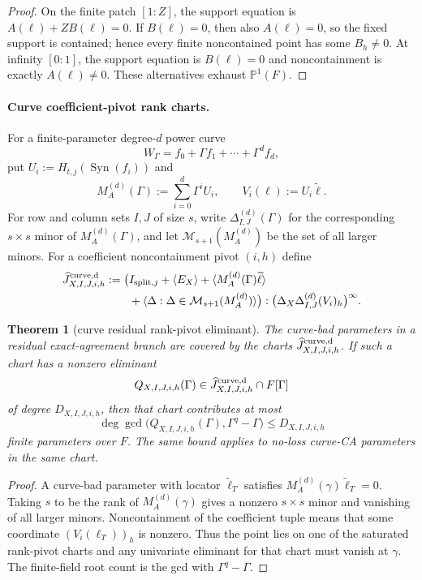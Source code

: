 \documentclass[11pt]{article}
\newtheorem{theorem}{Theorem}[section]
\theoremstyle{definition}
\theoremstyle{remark}
\newcommand{\Syn}{\operatorname{Syn}}
\begin{document}
\begin{proof}
On the finite patch $[1:Z]$, the support equation is
$A(\ell)+ZB(\ell)=0$.  If $B(\ell)=0$, then also $A(\ell)=0$, so the fixed
support is contained; hence every finite noncontained point has some
$B_h\ne0$.  At infinity $[0:1]$, the support equation is $B(\ell)=0$ and
noncontainment is exactly $A(\ell)\ne0$.  These alternatives exhaust
$\mathbb P^1(F)$.
\end{proof}

\paragraph{Curve coefficient-pivot rank charts.}
For a finite-parameter degree-$d$ power curve
\[
        W_\Gamma=f_0+\Gamma f_1+\cdots+\Gamma^d f_d,
\]
put $U_i:=H_{t,j}(\Syn(f_i))$ and
\[
        M_A^{(d)}(\Gamma):=
        \sum_{i=0}^{d}\Gamma^i U_i,
        \qquad
        V_i(\ell):=U_i\widetilde\ell .
\]
For row and column sets $I,J$ of size $s$, write
$\Delta_{I,J}^{(d)}(\Gamma)$ for the corresponding $s\times s$ minor of
$M_A^{(d)}(\Gamma)$, and let $\mathcal M_{s+1}(M_A^{(d)})$ be the set of all
larger minors.  For a coefficient noncontainment pivot $(i,h)$ define
\[
\begin{aligned}
        \widehat J^{\rm curve,d}_{X,I,J,i,h}:=
        \bigl(&I_{{\rm split},j}+\langle E_X\rangle
        +\langle M_A^{(d)}(\Gamma)\widetilde\ell\rangle\\
        &+\langle \Delta: \Delta\in\mathcal M_{s+1}(M_A^{(d)})\rangle
        \bigr):
        \bigl(\Delta_X\Delta_{I,J}^{(d)}(V_i)_h\bigr)^\infty .
\end{aligned}
\]

\begin{theorem}[curve residual rank-pivot eliminant]
\label{thm:curve-residual-rank-pivot-eliminant}
The curve-bad parameters in a residual exact-agreement branch are covered by the
charts $\widehat J^{\rm curve,d}_{X,I,J,i,h}$.  If such a chart has a nonzero
eliminant
\[
        Q_{X,I,J,i,h}(\Gamma)
        \in \widehat J^{\rm curve,d}_{X,I,J,i,h}\cap F[\Gamma]
\]
of degree $D_{X,I,J,i,h}$, then that chart contributes at most
\[
        \deg\gcd\bigl(Q_{X,I,J,i,h}(\Gamma),\Gamma^q-\Gamma\bigr)
        \le D_{X,I,J,i,h}
\]
finite parameters over $F$.  The same bound applies to no-loss curve-CA
parameters in the same chart.
\end{theorem}

\begin{proof}
A curve-bad parameter with locator $\widetilde\ell_T$ satisfies
$M_A^{(d)}(\gamma)\widetilde\ell_T=0$.  Taking $s$ to be the rank of
$M_A^{(d)}(\gamma)$ gives a nonzero $s\times s$ minor and vanishing of all larger
minors.  Noncontainment of the coefficient tuple means that some coordinate
$(V_i(\ell_T))_h$ is nonzero.  Thus the point lies on one of the saturated
rank-pivot charts and any univariate eliminant for that chart must vanish at
$\gamma$.  The finite-field root count is the gcd with $\Gamma^q-\Gamma$.
\end{proof}
\end{document}
